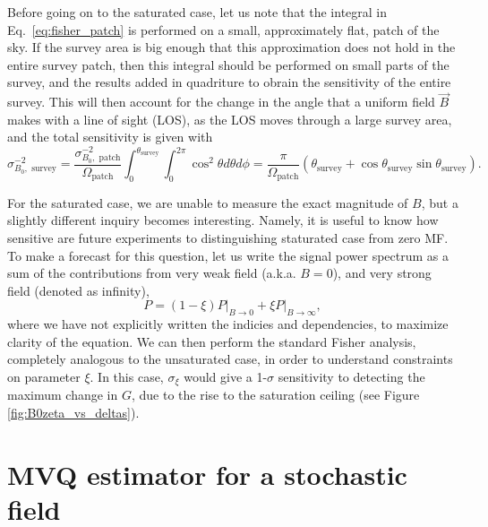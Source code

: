 \documentclass[12pt]{paper}
\newcommand{\beq}{\begin{equation}}
\newcommand{\eeq}{\end{equation}}
\begin{document}
Before going on to the saturated case, let us note that the integral in Eq.~\ref{eq:fisher_patch} is performed on a small, approximately flat, patch of the sky. If the survey area is big enough that this approximation does not hold in the entire survey patch, then this integral should be performed on small parts of the survey, and the results added in quadriture to obrain the sensitivity of the entire survey. This will then account for the change in the angle that a uniform field $\vec B$ makes with a line of sight (LOS), as the LOS moves through a large survey area, and the total sensitivity is given with
\beq
\sigma^{-2}_{B_0,\text{ survey}} = \frac{\sigma^{-2}_{B_0,\text{ patch}}}{\Omega_\text{patch}} \int_0^{\theta_\text{survey}}\int_{0}^{2\pi} \cos^2 \theta d\theta d\phi 
= \frac{\pi}{\Omega_\text{patch}} \left(\theta_\text{survey} + \cos \theta_\text{survey} \sin \theta_\text{survey}\right).
\label{eq:sigma_sum_survey}
\eeq

For the saturated case, we are unable to measure the exact magnitude of $B$, but a slightly different inquiry becomes interesting. Namely, it is useful to know how sensitive are future experiments to distinguishing staturated case from zero MF. To make a forecast for this question, let us write the signal power spectrum as a sum of the contributions from very weak field (a.k.a. $B=0$), and very strong field (denoted as infinity), 
\beq
P = (1-\xi)P\bigg|_{B\to 0} + \xi P\bigg|_{B\to \infty},
\label{eq:saturated_P}
\eeq
where we have not explicitly written the indicies and dependencies, to maximize clarity of the equation. We can then perform the standard Fisher analysis, completely analogous to the unsaturated case, in order to understand constraints on parameter $\xi$. In this case, $\sigma_\xi$ would give a 1-$\sigma$ sensitivity to detecting the maximum change in $G$, due to the rise to the saturation ceiling (see Figure \ref{fig:B0zeta_vs_deltas}). 

\section{MVQ estimator for a stochastic field}
\end{document}
